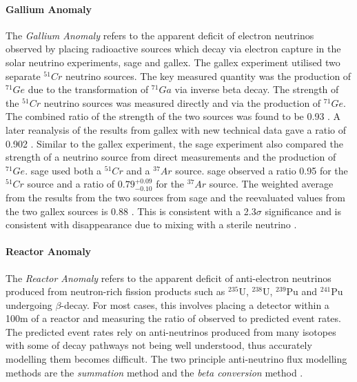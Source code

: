 \paragraph{Gallium Anomaly}
The \textit{Gallium Anomaly} refers to the apparent deficit of electron neutrinos observed by placing radioactive sources which decay via electron capture in the solar neutrino experiments, \gls{sage} and \gls{gallex}. The \gls{gallex} experiment utilised two separate $^{51}Cr$ neutrino sources. The key measured quantity was the production of $^{71}Ge$ due to the transformation of $^{71}Ga$ via inverse beta decay. The strength of the $^{51}Cr$ neutrino sources was measured directly and via the production of $^{71}Ge$. The combined ratio of the strength of the two sources was found to be 0.93 \cite{GALLEX}. A later reanalysis of the results from \gls{gallex} with new technical data gave a ratio of 0.902 \cite{Gallex_reanalysis}. Similar to the \gls{gallex} experiment, the \gls{sage} experiment also compared the strength of a neutrino source from direct measurements and the production of $^{71}Ge$. \gls{sage} used both a $^{51}Cr$ and a $^{37}Ar$ source.  \gls{sage} observed a ratio 0.95 for the $^{51}Cr$ source and a ratio of $0.79^{+0.09}_{-0.10}$ for the $^{37}Ar$ source. The weighted average from the results from the two sources from \gls{sage} and the reevaluated values from the two \gls{gallex} sources is 0.88 \cite{SAGE}. This is consistent with a 2.3$\sigma$ significance and is consistent with \nuebar disappearance due to mixing with a sterile neutrino \cite{gallium_anomaly}.

\paragraph{Reactor Anomaly}
The \textit{Reactor Anomaly} refers to the apparent deficit of anti-electron neutrinos produced from neutron-rich fission products such as $^{235}$U, $^{238}$U, $^{239}$Pu and $^{241}$Pu undergoing  $\beta$-decay. For most cases, this involves placing a detector within a 100m of a reactor and measuring the ratio of observed to predicted event rates. The predicted event rates rely on anti-neutrinos produced from many isotopes with some of decay pathways not being well understood, thus accurately modelling them becomes difficult. The two principle anti-neutrino flux modelling methods are the \textit{summation} method and the \textit{beta conversion} method \cite{Reactor_anomaly}\cite{snowmass_2021}.
 
